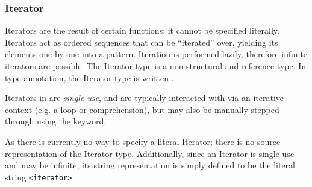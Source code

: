 \subsubsection{Iterator}

Iterators are the result of certain functions; it cannot be specified literally.
Iterators act as ordered sequences that can be ``iterated'' over, yielding its
elements one by one into a pattern. Iteration is performed lazily, therefore
infinite iterators are possible. The Iterator type is a non-structural and
reference type. In type annotation, the Iterator type is written .

Iterators in \Trilogy{} are \emph{single use}, and are typically interacted
with via an iterative context (e.g. a  loop or comprehension), but
may also be manually stepped through using the  keyword.

As there is currently no way to specify a literal Iterator; there is no
source representation of the Iterator type. Additionally, since an Iterator
is single use and may be infinite, its string representation is simply defined
to be the literal string \texttt{<iterator>}.
